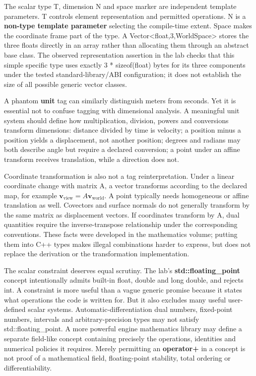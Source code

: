 The scalar type T, dimension N and space marker are independent template parameters. T controls element representation and permitted operations. N is a \textbf{non-type template parameter} selecting the compile-time extent. Space makes the coordinate frame part of the type. A Vector\textless float,3,WorldSpace\textgreater{} stores the three floats directly in an array rather than allocating them through an abstract base class. The observed representation assertion in the lab checks that this simple specific type uses exactly 3 * sizeof(float) bytes for its three components under the tested standard-library/ABI configuration; it does not establish the size of all possible generic vector classes.

A phantom \textbf{unit} tag can similarly distinguish meters from seconds. Yet it is essential not to confuse tagging with dimensional analysis. A meaningful unit system should define how multiplication, division, powers and conversions transform dimensions: distance divided by time is velocity; a position minus a position yields a displacement, not another position; degrees and radians may both describe angle but require a declared conversion; a point under an affine transform receives translation, while a direction does not.

Coordinate transformation is also not a tag reinterpretation. Under a linear coordinate change with matrix A, a vector transforms according to the declared map, for example \(\mathbf{v}_{\mathrm{view}}=A\mathbf{v}_{\mathrm{world}}\). A point typically needs homogeneous or affine translation as well. Covectors and surface normals do not generally transform by the same matrix as displacement vectors. If coordinates transform by A, dual quantities require the inverse-transpose relationship under the corresponding conventions. These facts were developed in the mathematics volume; putting them into C++ types makes illegal combinations harder to express, but does not replace the derivation or the transformation implementation.

The scalar constraint deserves equal scrutiny. The lab's \textbf{std::floating\_point} concept intentionally admits built-in float, double and long double, and rejects int. A constraint is more useful than a vague generic promise because it states what operations the code is written for. But it also excludes many useful user-defined scalar systems. Automatic-differentiation dual numbers, fixed-point numbers, intervals and arbitrary-precision types may not satisfy std::floating\_point. A more powerful engine mathematics library may define a separate field-like concept containing precisely the operations, identities and numerical policies it requires. Merely permitting an \textbf{operator+} in a concept is not proof of a mathematical field, floating-point stability, total ordering or differentiability.

